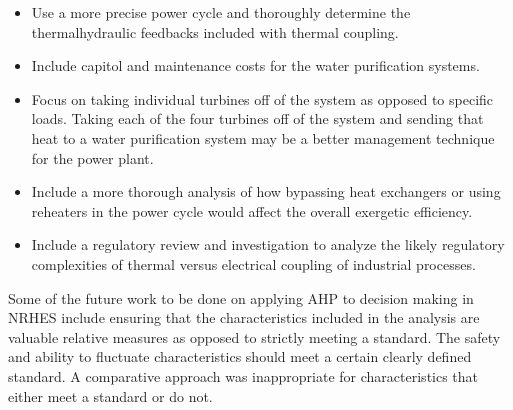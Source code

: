 \begin{itemize}
\item Use a more precise power cycle and thoroughly determine the thermalhydraulic feedbacks included with thermal coupling.
\item Include capitol and maintenance costs for the water purification systems.
\item Focus on taking individual turbines off of the system as opposed to specific loads.  Taking each of the four turbines off of the system and sending that heat to a water purification system may be a better management technique for the power plant.
\item Include a more thorough analysis of how bypassing heat exchangers or using reheaters in the power cycle would affect the overall exergetic efficiency.
\item Include a regulatory review and investigation to analyze the likely regulatory complexities of thermal versus electrical coupling of industrial processes.
\end{itemize}

Some of the future work to be done on applying AHP to decision making in NRHES include ensuring that the characteristics included in the analysis are valuable relative measures as opposed to strictly meeting a standard. The safety and ability to fluctuate characteristics should meet a certain clearly defined standard.  A comparative approach was inappropriate for characteristics that either meet a standard or do not. 

